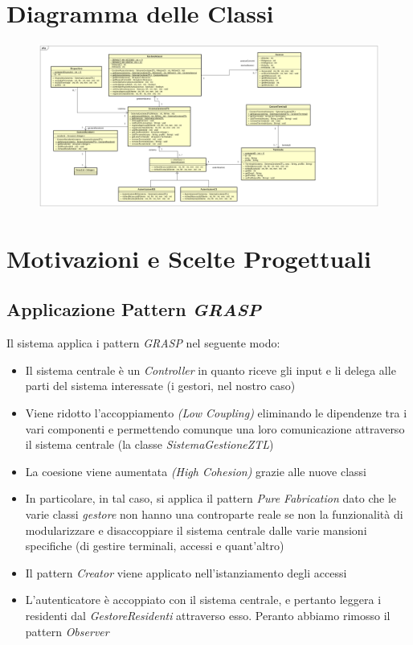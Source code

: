 \documentclass[12pt, letterpaper]{article}
\begin{document}
\section{Diagramma delle Classi}
\begin{figure}[H]
    \centering
    \includegraphics[scale=0.15]{DCD}
    \label{fig:mesh1}
\end{figure}

\section{Motivazioni e Scelte Progettuali}

\subsection{Applicazione Pattern \emph{GRASP} }
Il sistema applica i pattern \emph{GRASP} 
nel seguente modo:
\begin{itemize}
    \item Il sistema centrale è un \emph{Controller}
    in quanto riceve gli input e li delega 
    alle parti del sistema interessate 
    (i gestori, nel nostro caso)
    \item Viene ridotto l'accoppiamento \emph{(Low
    Coupling)} eliminando le dipendenze tra i 
    vari componenti e permettendo comunque una 
    loro comunicazione attraverso il sistema 
    centrale (la classe \emph{SistemaGestioneZTL})
    \item La coesione viene aumentata \emph{(High 
    Cohesion)} grazie alle nuove classi
    \item In particolare, in tal caso, si applica 
    il pattern \emph{Pure Fabrication} dato che 
    le varie classi \emph{gestore} non hanno una 
    controparte reale se non la funzionalità di 
    modularizzare e disaccoppiare il sistema 
    centrale dalle varie mansioni specifiche (di 
    gestire terminali, accessi e quant'altro)
    \item Il pattern \emph{Creator} viene applicato 
    nell'istanziamento degli accessi
    \item L'autenticatore è accoppiato con il sistema 
    centrale, e pertanto leggera i residenti dal 
    \emph{GestoreResidenti} attraverso esso. 
    Peranto abbiamo rimosso il pattern \emph{Observer}
\end{itemize}
\end{document}
